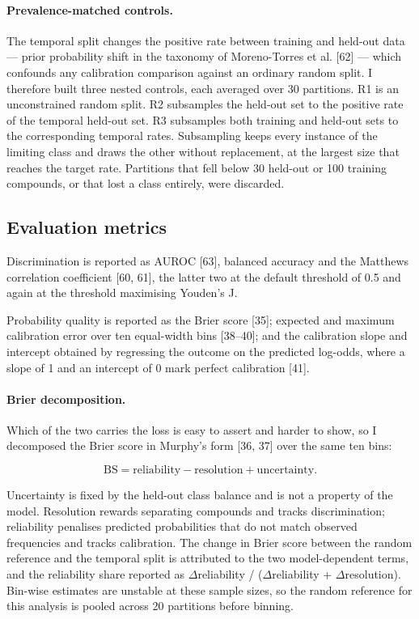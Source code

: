 \paragraph{Prevalence-matched controls.}
The temporal split changes the positive rate between training and held-out data --- prior probability shift in the taxonomy of Moreno-Torres et al. [62] --- which confounds any calibration comparison against an ordinary random split. I therefore built three nested controls, each averaged over 30 partitions. R1 is an unconstrained random split. R2 subsamples the held-out set to the positive rate of the temporal held-out set. R3 subsamples both training and held-out sets to the corresponding temporal rates. Subsampling keeps every instance of the limiting class and draws the other without replacement, at the largest size that reaches the target rate. Partitions that fell below 30 held-out or 100 training compounds, or that lost a class entirely, were discarded.

\subsection{Evaluation metrics}

Discrimination is reported as AUROC [63], balanced accuracy and the Matthews correlation coefficient [60, 61], the latter two at the default threshold of 0.5 and again at the threshold maximising Youden's J.

Probability quality is reported as the Brier score [35]; expected and maximum calibration error over ten equal-width bins [38--40]; and the calibration slope and intercept obtained by regressing the outcome on the predicted log-odds, where a slope of 1 and an intercept of 0 mark perfect calibration [41].

\paragraph{Brier decomposition.}
Which of the two carries the loss is easy to assert and harder to show, so I decomposed the Brier score in Murphy's form [36, 37] over the same ten bins:

\begin{equation}
\mathrm{BS} = \mathrm{reliability} - \mathrm{resolution} + \mathrm{uncertainty}.
\end{equation}

Uncertainty is fixed by the held-out class balance and is not a property of the model. Resolution rewards separating compounds and tracks discrimination; reliability penalises predicted probabilities that do not match observed frequencies and tracks calibration. The change in Brier score between the random reference and the temporal split is attributed to the two model-dependent terms, and the reliability share reported as $\Delta$reliability / ($\Delta$reliability + $\Delta$resolution). Bin-wise estimates are unstable at these sample sizes, so the random reference for this analysis is pooled across 20 partitions before binning.

